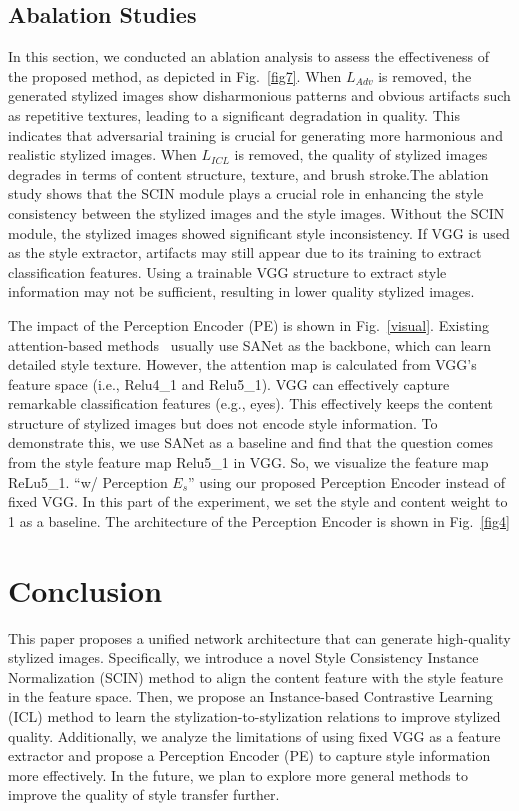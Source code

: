 \documentclass[times,twocolumn,final,authoryear]{elsarticle}
\begin{document}
\subsection{Abalation Studies}
In this section, we conducted an ablation analysis to assess the effectiveness of the proposed method, as depicted in Fig.~\ref{fig7}.
When $L_{Adv}$ is removed, the generated stylized images show disharmonious patterns and obvious artifacts such as repetitive textures, leading to a significant degradation in quality. This indicates that adversarial training is crucial for generating more harmonious and realistic stylized images. When $L_{ICL}$ is removed, the quality of stylized images degrades in terms of content structure, texture, and brush stroke.The ablation study shows that the SCIN module plays a crucial role in enhancing the style consistency between the stylized images and the style images. Without the SCIN module, the stylized images showed significant style inconsistency. If VGG is used as the style extractor, artifacts may still appear due to its training to extract classification features. Using a trainable VGG structure to extract style information may not be sufficient, resulting in lower quality stylized images.

The impact of the Perception Encoder (PE) is shown in Fig.~\ref{visual}. Existing attention-based methods~\citep{li2023dudoinet,li2023self,li2023rethinking,cui2022attention} usually use SANet as the backbone, which can learn detailed style texture. However, the attention map is calculated from VGG's feature space (i.e., Relu4\_1 and Relu5\_1). VGG can effectively capture remarkable classification features (e.g., eyes). This effectively keeps the content structure of stylized images but does not encode style information. To demonstrate this, we use SANet as a baseline and find that the question comes from the style feature map Relu5\_1 in VGG. So, we visualize the feature map ReLu5\_1. ``w/ Perception $E_{s}$'' using our proposed Perception Encoder instead of fixed VGG. In this part of the experiment, we set the style and content weight to 1 as a baseline. The architecture of the Perception Encoder is shown in Fig.~\ref{fig4}


\section{Conclusion}
This paper proposes a unified network architecture that can generate high-quality stylized images. Specifically, we introduce a novel Style Consistency Instance Normalization (SCIN) method to align the content feature with the style feature in the feature space. Then, we propose an Instance-based Contrastive Learning (ICL) method to learn the stylization-to-stylization relations to improve stylized quality. Additionally, we analyze the limitations of using fixed VGG as a feature extractor and propose a Perception Encoder (PE) to capture style information more effectively. In the future, we plan to explore more general methods to improve the quality of style transfer further.
\end{document}
